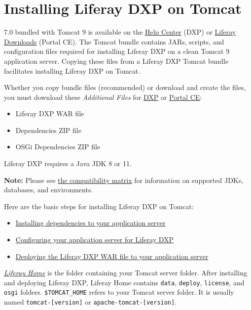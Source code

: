\section{Installing Liferay DXP on
Tomcat}\label{installing-liferay-dxp-on-tomcat}

7.0 bundled with Tomcat 9 is available on the
\href{https://help.liferay.com/hc}{Help Center} (DXP) or
\href{https://www.liferay.com/downloads}{Liferay Downloads} (Portal CE).
The Tomcat bundle contains JARs, scripts, and configuration files
required for installing Liferay DXP on a clean Tomcat 9 application
server. Copying these files from a Liferay DXP Tomcat bundle facilitates
installing Liferay DXP on Tomcat.

Whether you copy bundle files (recommended) or download and create the
files, you must download these \emph{Additional Files} for
\href{https://help.liferay.com/hc}{DXP} or
\href{https://www.liferay.com/downloads-community}{Portal CE}:

\begin{itemize}
\tightlist
\item
  Liferay DXP WAR file
\item
  Dependencies ZIP file
\item
  OSGi Dependencies ZIP file
\end{itemize}

Liferay DXP requires a Java JDK 8 or 11.

\noindent\hrulefill

\textbf{Note:} Please see
\href{https://www.liferay.com/documents/10182/246659966/Liferay+DXP+7.1+Compatibility+Matrix.pdf/c8805b72-c693-1f26-3f2d-731ffc301366}{the
compatibility matrix} for information on supported JDKs, databases, and
environments.

\noindent\hrulefill

Here are the basic steps for installing Liferay DXP on Tomcat:

\begin{itemize}
\tightlist
\item
  \hyperref[installing-dependencies]{Installing dependencies to your
  application server}
\item
  \hyperref[configuring-tomcat]{Configuring your application server for
  Liferay DXP}
\item
  \hyperref[deploying-liferay]{Deploying the Liferay DXP WAR file to
  your application server}
\end{itemize}

\href{/docs/7-1/deploy/-/knowledge_base/d/installing-liferay\#liferay-home}{\emph{Liferay
Home}} is the folder containing your Tomcat server folder. After
installing and deploying Liferay DXP, Liferay Home contains
\texttt{data}, \texttt{deploy}, \texttt{license}, and \texttt{osgi}
folders. \texttt{\$TOMCAT\_HOME} refers to your Tomcat server folder. It
is usually named \texttt{tomcat-{[}version{]}} or
\texttt{apache-tomcat-{[}version{]}}.

